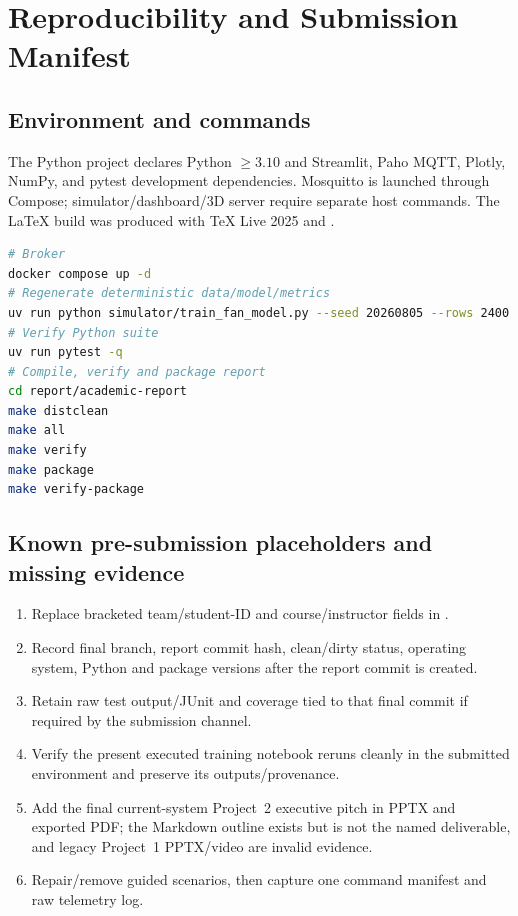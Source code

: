 \chapter{Reproducibility and Submission Manifest}
\label{app:repro}

\section{Environment and commands}
The Python project declares Python $\ge3.10$ and Streamlit, Paho MQTT, Plotly, NumPy, and pytest development dependencies. Mosquitto is launched through Compose; simulator/dashboard/3D server require separate host commands. The LaTeX build was produced with TeX Live 2025 and .

\begin{lstlisting}[language=bash,caption={Core reproduction commands (from the Simulation\_Room root unless noted).}]
# Broker
docker compose up -d
# Regenerate deterministic data/model/metrics
uv run python simulator/train_fan_model.py --seed 20260805 --rows 2400
# Verify Python suite
uv run pytest -q
# Compile, verify and package report
cd report/academic-report
make distclean
make all
make verify
make package
make verify-package
\end{lstlisting}

\section{Known pre-submission placeholders and missing evidence}
\begin{enumerate}
\item Replace bracketed team/student-ID and course/instructor fields in .
\item Record final branch, report commit hash, clean/dirty status, operating system, Python and package versions after the report commit is created.
\item Retain raw test output/JUnit and coverage tied to that final commit if required by the submission channel.
\item Verify the present executed training notebook reruns cleanly in the submitted environment and preserve its outputs/provenance.
\item Add the final current-system Project~2 executive pitch in PPTX and exported PDF; the Markdown outline exists but is not the named deliverable, and legacy Project~1 PPTX/video are invalid evidence.
\item Repair/remove guided scenarios, then capture one command manifest and raw telemetry log.
\end{enumerate}

